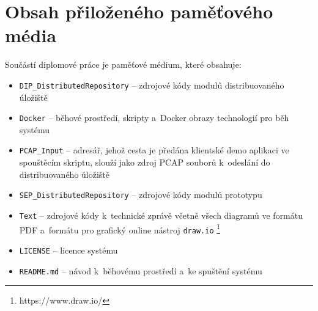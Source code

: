 


\chapter{Obsah přiloženého paměťového média}
Součástí diplomové práce je paměťové médium, které obsahuje:

\begin{itemize}
    \item \texttt{DIP\_DistributedRepository} -- zdrojové kódy modulů distribuovaného úložiště
    
    \item \texttt{Docker} -- běhové prostředí, skripty a~Docker obrazy technologií pro běh systému
    
    \item \texttt{PCAP\_Input} -- adresář, jehož cesta je předána klientské demo aplikaci ve spouštěcím skriptu, slouží jako zdroj PCAP souborů k~odeslání do distribuovaného úložiště
    
    \item \texttt{SEP\_DistributedRepository} -- zdrojové kódy modulů prototypu
    
    \item \texttt{Text} -- zdrojové kódy k~technické zprávě včetně všech diagramů ve formátu PDF a~formátu pro grafický online nástroj \texttt{draw.io} \footnote{https://www.draw.io/}
    
    \item \texttt{LICENSE} -- licence systému
    
    \item \texttt{README.md} -- návod k~běhovému prostředí a~ke spuštění systému
\end{itemize}

